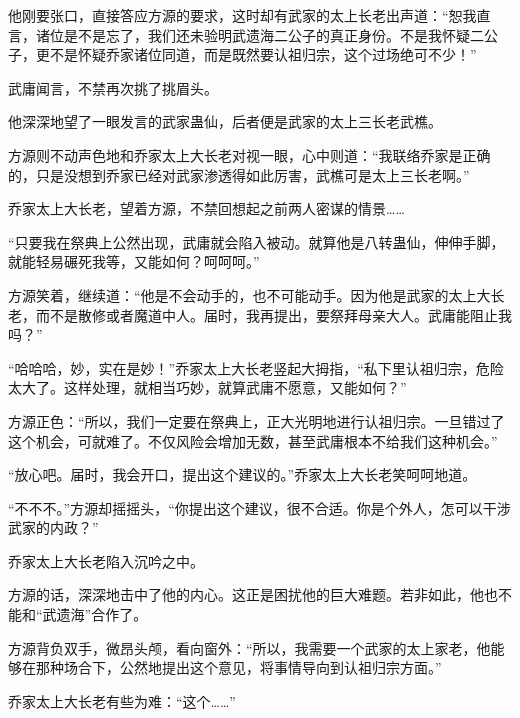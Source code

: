 \begin{this_body}
他刚要张口，直接答应方源的要求，这时却有武家的太上长老出声道：“恕我直言，诸位是不是忘了，我们还未验明武遗海二公子的真正身份。不是我怀疑二公子，更不是怀疑乔家诸位同道，而是既然要认祖归宗，这个过场绝可不少！”

武庸闻言，不禁再次挑了挑眉头。

他深深地望了一眼发言的武家蛊仙，后者便是武家的太上三长老武樵。

方源则不动声色地和乔家太上大长老对视一眼，心中则道：“我联络乔家是正确的，只是没想到乔家已经对武家渗透得如此厉害，武樵可是太上三长老啊。”

乔家太上大长老，望着方源，不禁回想起之前两人密谋的情景……

“只要我在祭典上公然出现，武庸就会陷入被动。就算他是八转蛊仙，伸伸手脚，就能轻易碾死我等，又能如何？呵呵呵。”

方源笑着，继续道：“他是不会动手的，也不可能动手。因为他是武家的太上大长老，而不是散修或者魔道中人。届时，我再提出，要祭拜母亲大人。武庸能阻止我吗？”

“哈哈哈，妙，实在是妙！”乔家太上大长老竖起大拇指，“私下里认祖归宗，危险太大了。这样处理，就相当巧妙，就算武庸不愿意，又能如何？”

方源正色：“所以，我们一定要在祭典上，正大光明地进行认祖归宗。一旦错过了这个机会，可就难了。不仅风险会增加无数，甚至武庸根本不给我们这种机会。”

“放心吧。届时，我会开口，提出这个建议的。”乔家太上大长老笑呵呵地道。

“不不不。”方源却摇摇头，“你提出这个建议，很不合适。你是个外人，怎可以干涉武家的内政？”

乔家太上大长老陷入沉吟之中。

方源的话，深深地击中了他的内心。这正是困扰他的巨大难题。若非如此，他也不能和“武遗海”合作了。

方源背负双手，微昂头颅，看向窗外：“所以，我需要一个武家的太上家老，他能够在那种场合下，公然地提出这个意见，将事情导向到认祖归宗方面。”

乔家太上大长老有些为难：“这个……”

\end{this_body}

